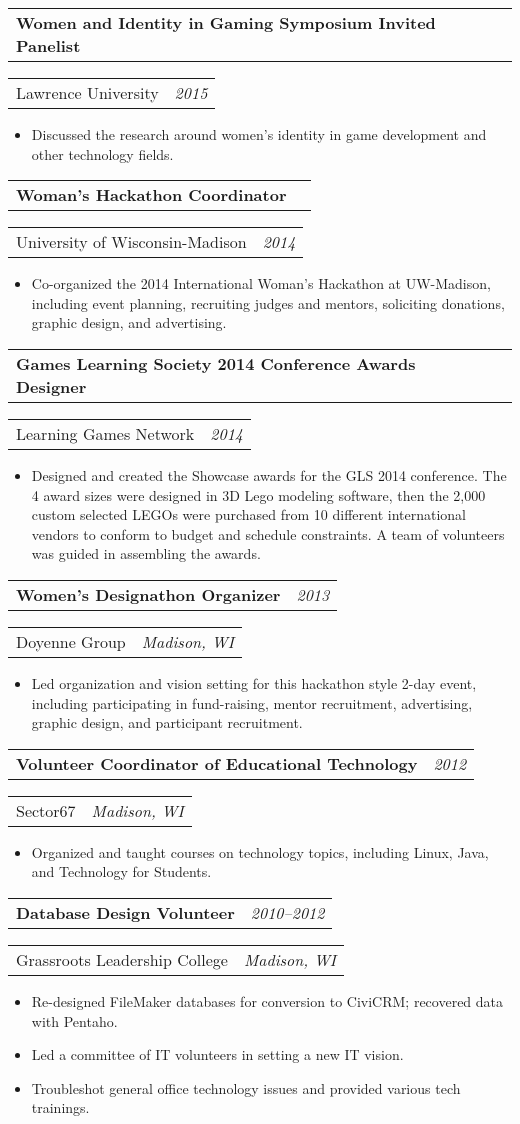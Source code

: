 \documentclass[letterpaper,11pt]{article}
\newcommand{\resitem}[1]{\item #1 \vspace{-8pt}}
\newcommand{\ressubheading}[4]{\vspace{4pt}
	\begin{tabularx}{\textwidth}{X r}
		\textbf{#1} & \textit{#4}
	\end{tabularx}

	\begin{tabularx}{\textwidth}{X r}
		#2 & \textit{#3}
	\end{tabularx}\vspace{-6pt}

}
\begin{document}
\ressubheading{Women and Identity in Gaming Symposium Invited Panelist}{Lawrence University}{2015}{}
\begin{itemize}
		\resitem{Discussed the research around women's identity in game development and other technology fields.}
	\end{itemize}

\ressubheading{Woman's Hackathon Coordinator}{University of Wisconsin-Madison}{2014}{}
\begin{itemize}
		\resitem{Co-organized the 2014 International Woman's Hackathon at UW-Madison, including event planning, recruiting judges and mentors, soliciting donations, graphic design, and advertising.}
	\end{itemize}

\ressubheading{Games Learning Society 2014 Conference Awards Designer}{Learning Games Network}{2014}{}
\begin{itemize}
		\resitem{Designed and created the Showcase awards for the GLS 2014 conference. The 4 award sizes were designed in 3D Lego modeling software, then the 2,000 custom selected LEGOs were purchased from 10 different international vendors to conform to budget and schedule constraints. A team of volunteers was guided in assembling the awards.}
	\end{itemize}

	\ressubheading{Women's Designathon Organizer}{Doyenne Group}{Madison, WI}{2013}{}
	\begin{itemize}
		\resitem{Led organization and vision setting for this hackathon style 2-day event, including participating in fund-raising, mentor recruitment, advertising, graphic design, and participant recruitment.}
	\end{itemize}


	\ressubheading{Volunteer Coordinator of Educational Technology}{Sector67}{Madison, WI}{2012}{}
	\begin{itemize}
		\resitem{Organized and taught courses on technology topics, including Linux, Java, and Technology for Students.}
	\end{itemize}

	\ressubheading{Database Design Volunteer}{Grassroots Leadership College}{Madison, WI}{2010--2012}{}
	\begin{itemize}
		\resitem{Re-designed FileMaker databases for conversion to CiviCRM; recovered data with Pentaho.}
		\resitem{Led a committee of IT volunteers in setting a new IT vision.}
		\resitem{Troubleshot general office technology issues and provided various tech trainings.}
	\end{itemize}
\end{document}
